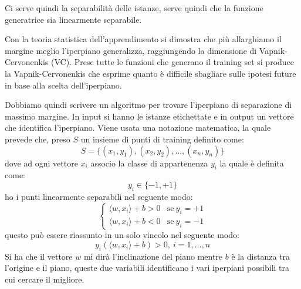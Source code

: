 Ci serve quindi la separabilità delle istanze, serve quindi che la funzione generatrice
sia linearmente separabile.
\begin{teorema}
    Con la teoria statistica dell'apprendimento si dimostra che più allarghiamo
    il margine meglio l'iperpiano generalizza, raggiungendo la dimensione di
    Vapnik-Cervonenkis (VC). Prese tutte le funzioni che generano il training
    set si produce la Vapnik-Cervonenkis che esprime quanto è difficile sbagliare
    sulle ipotesi future in base alla scelta dell'iperpiano.
\end{teorema}
Dobbiamo quindi scrivere un algoritmo per trovare l'iperpiano di separazione di
massimo margine. In input si hanno le istanze etichettate e in output un vettore
che identifica l'iperpiano. Viene usata una notazione matematica, la quale prevede
che, preso $S$ un insieme di punti di training definito come:
\begin{equation}
    S = \{(x_1, y_1), (x_2, y_2),\dots, (x_n, y_n)\}
\end{equation}
dove ad ogni vettore $x_i$ associo la classe di appartenenza $y_i$ la quale è
definita come:
\begin{equation}
    y_i \in \{-1, +1\}
\end{equation}
ho i punti linearmente separabili nel seguente modo:
\begin{equation}
    \begin{cases}
        \langle w, x_i \rangle + b > 0 & \text{se} \ y_i = +1 \\
        \langle w, x_i \rangle + b < 0 & \text{se} \ y_i = -1
    \end{cases}
\end{equation}
questo può essere riassunto in un solo vincolo nel seguente modo:
\begin{equation}
    y_i(\langle w, x_i\rangle + b) > 0, \  i = 1,\dots, n
\end{equation}
Si ha che il vettore $w$ mi dirà l'inclinazione del piano mentre $b$ è la distanza
tra l'origine e il piano, queste due variabili identificano i vari iperpiani
possibili tra cui cercare il migliore.

